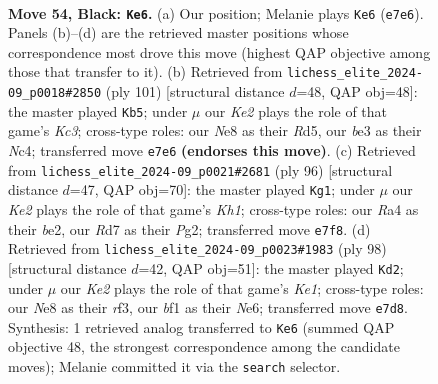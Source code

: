 \documentclass[11pt]{article}
\begin{document}
\clearpage

\begin{figure}[p]\centering
\begin{subfigure}{0.46\textwidth}\centering
\resizebox{\linewidth}{!}{%
\newchessgame
\chessboard[
  setfen={4n3/p1prk2R/8/5p2/r4P2/4B3/2K4P/5BR1 b - - 13 54},
  showmover=false,
  pgfstyle=straightmove, color=movearrow, markmove={e7-e6}
]}
\caption{}
\end{subfigure}\hfill
\begin{subfigure}{0.46\textwidth}\centering
\resizebox{\linewidth}{!}{%
\newchessgame
\chessboard[
  setfen={2r5/7p/2k1R1p1/p2r4/2n3P1/P7/KB2R2P/8 b - - 5 51},
  showmover=false,
  pgfstyle=straightmove, color=movearrow, markmove={c6-b5}
]}
\caption{}
\end{subfigure}
\\[4pt]
\begin{subfigure}{0.46\textwidth}\centering
\resizebox{\linewidth}{!}{%
\newchessgame
\chessboard[
  setfen={6k1/p7/P7/1p5p/7r/2RN4/1P2b1P1/7K w - - 0 49},
  showmover=false,
  pgfstyle=straightmove, color=movearrow, markmove={h1-g1}
]}
\caption{}
\end{subfigure}\hfill
\begin{subfigure}{0.46\textwidth}\centering
\resizebox{\linewidth}{!}{%
\newchessgame
\chessboard[
  setfen={6k1/8/4N3/5p2/4b3/P4r2/1P2R3/3RK1r1 w - - 3 50},
  showmover=false,
  pgfstyle=straightmove, color=movearrow, markmove={e1-d2}
]}
\caption{}
\end{subfigure}
\caption{\textbf{Move 54, Black: \texttt{Ke6}.} (a) Our position; Melanie plays \texttt{Ke6} (\texttt{e7e6}). Panels (b)--(d) are the retrieved master positions whose correspondence most drove this move (highest QAP objective among those that transfer to it). (b) Retrieved from \texttt{lichess\_elite\_2024-09\_p0018\#2850} (ply 101) [structural distance $d$=48, QAP obj=48]: the master played \texttt{Kb5}; under $\mu$ our \emph{Ke2} plays the role of that game's \emph{Kc3}; cross-type roles: our \emph{N}e8 as their \emph{R}d5, our \emph{b}e3 as their \emph{N}c4; transferred move \texttt{e7e6} \textbf{(endorses this move)}. (c) Retrieved from \texttt{lichess\_elite\_2024-09\_p0021\#2681} (ply 96) [structural distance $d$=47, QAP obj=70]: the master played \texttt{Kg1}; under $\mu$ our \emph{Ke2} plays the role of that game's \emph{Kh1}; cross-type roles: our \emph{R}a4 as their \emph{b}e2, our \emph{R}d7 as their \emph{P}g2; transferred move \texttt{e7f8}. (d) Retrieved from \texttt{lichess\_elite\_2024-09\_p0023\#1983} (ply 98) [structural distance $d$=42, QAP obj=51]: the master played \texttt{Kd2}; under $\mu$ our \emph{Ke2} plays the role of that game's \emph{Ke1}; cross-type roles: our \emph{N}e8 as their \emph{r}f3, our \emph{b}f1 as their \emph{N}e6; transferred move \texttt{e7d8}. Synthesis: 1 retrieved analog transferred to \texttt{Ke6} (summed QAP objective 48, the strongest correspondence among the candidate moves); Melanie committed it via the \texttt{search} selector.}
\label{fig:thought-m107}
\end{figure}
\end{document}
